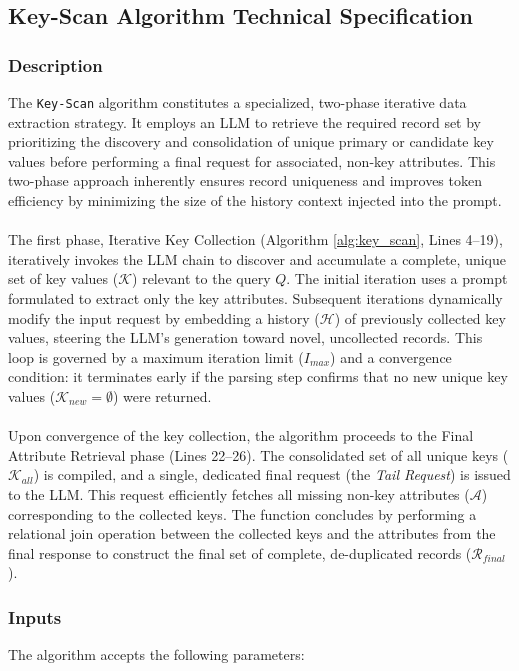 \newpage
\subsection{Key-Scan Algorithm Technical Specification}

\subsubsection{Description}
The \texttt{Key-Scan} algorithm constitutes a specialized, two-phase iterative data extraction strategy. It employs an LLM to retrieve the required record set by prioritizing the discovery and consolidation of unique primary or candidate key values before performing a final request for associated, non-key attributes. This two-phase approach inherently ensures record uniqueness and improves token efficiency by minimizing the size of the history context injected into the prompt.
\\\\
The first phase, Iterative Key Collection (Algorithm \ref{alg:key_scan}, Lines 4--19), iteratively invokes the LLM chain to discover and accumulate a complete, unique set of key values ($\mathcal{K}$) relevant to the query $Q$. The initial iteration uses a prompt formulated to extract only the key attributes. Subsequent iterations dynamically modify the input request by embedding a history ($\mathcal{H}$) of previously collected key values, steering the LLM's generation toward novel, uncollected records. This loop is governed by a maximum iteration limit ($I_{max}$) and a convergence condition: it terminates early if the parsing step confirms that no new unique key values ($\mathcal{K}_{new} = \emptyset$) were returned.
\\\\
Upon convergence of the key collection, the algorithm proceeds to the Final Attribute Retrieval phase (Lines 22--26). The consolidated set of all unique keys ($\mathcal{K}_{all}$) is compiled, and a single, dedicated final request (the \textit{Tail Request}) is issued to the LLM. This request efficiently fetches all missing non-key attributes ($\mathcal{A}$) corresponding to the collected keys. The function concludes by performing a relational join operation between the collected keys and the attributes from the final response to construct the final set of complete, de-duplicated records ($\mathcal{R}_{final}$).

\subsubsection{Inputs}
The algorithm accepts the following parameters:

